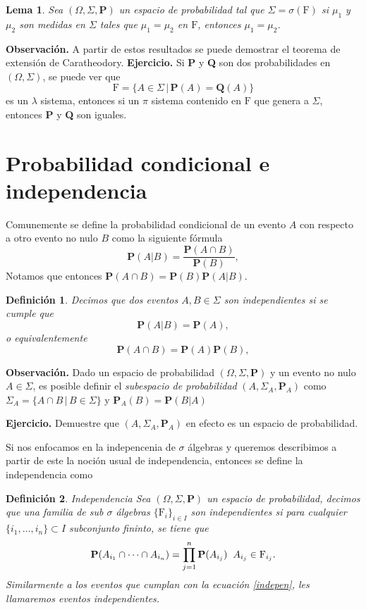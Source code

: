 \documentclass[letterpaper]{book}
\newtheorem{lema}[teorema]{Lema}
\newtheorem{def.}{Definici\'on}[section]
\newcommand{\prob}{\textbf{P}}
\newcommand{\eje}{{\newline \noindent \sc \textbf{Ejercicio. }}}
\newcommand{\obs}{{\newline \noindent \sc \textbf{Observación. }}}
\newcommand{\om}{\ensuremath{\Omega}}
\newcommand{\sig}{\ensuremath{\Sigma}}
\begin{document}
\begin{lema}
Sea $(\om,\sig,\prob)$ un espacio de probabilidad tal que $\sig=\sigma(\mathrm{F})$ si $\mu_1$ y $\mu_2$ son medidas en $\sig$ tales que $\mu_1=\mu_2$ en $\mathrm{F}$, entonces $\mu_1=\mu_2$.
\end{lema}
\obs A partir de estos resultados se puede demostrar el teorema de extensión de Caratheodory.
\eje Si \textbf{P} y \textbf{Q} son dos probabilidades en \((\Omega,\Sigma)\), se puede ver que
\[
    \mathrm{F}=\{A\in\Sigma\,\vert\,\textbf{P}(A)=\textbf{Q}(A)\}
\]
es un \(\lambda\) sistema, entonces si un \(\pi\) sistema contenido en \(\mathrm{F}\) que genera a \(\Sigma\), entonces \textbf{P} y \textbf{Q} son iguales.

\section{Probabilidad condicional e independencia}
\label{sec:org9d4ac91}
\noindent Comunemente se define la probabilidad condicional de un evento \(A\) con respecto a otro evento no nulo \(B\) como la siguiente fórmula
\[
    \prob(A|B)=\frac{\prob(A\cap B)}{\prob(B)},
\]
Notamos que entonces \(\prob(A\cap B)=\prob(B)\prob(A|B)\).
\begin{def.}
Decimos que dos eventos \(A,B\in\sig\) son \emph{independientes} si se cumple que
\[
\prob(A|B)=\prob(A),
\]
o equivalentemente 
\[
\prob(A\cap B)=\prob(A)\prob(B),
\]
\end{def.}
\obs Dado un espacio de probabilidad \((\om,\sig,\prob)\) y un evento no nulo \(A\in\sig\), es posible definir el \emph{subespacio de probabilidad} \((A,\sig_A,\prob_A)\) como \(\sig_A=\{A\cap B\,|\,B\in\sig\}\) y \(\prob_A(B)=\prob(B|A)\)

\eje Demuestre que \((A,\sig_A,\prob_A)\) en efecto es un espacio de probabilidad.

Si nos enfocamos en la indepencenia de \(\sigma\) álgebras y queremos describimos a partir de este la noción usual de independencia, entonces se define la independencia como
\begin{def.}{Independencia}
Sea \((\om,\sig,\prob)\) un espacio de probabilidad, decimos que una familia de sub \(\sigma\) álgebras \(\{\mathrm{F}_i\}_{i\in I}\) son \emph{independientes} si para cualquier \(\{i_1,\dots,i_n\}\subset I\) subconjunto fininto, se tiene que
\begin{equation}\label{indepen}
    \prob(A_{i_1}\cap\dots\cap A_{i_n})=\prod_{j=1}^n\prob(A_{i_j})\hspace{0.2cm}A_{i_j}\in\mathrm{F}_{i_j}.
\end{equation}
Similarmente a los eventos que cumplan con la ecuación \ref{indepen}, les llamaremos eventos \emph{independientes}.
\end{def.}
\end{document}
